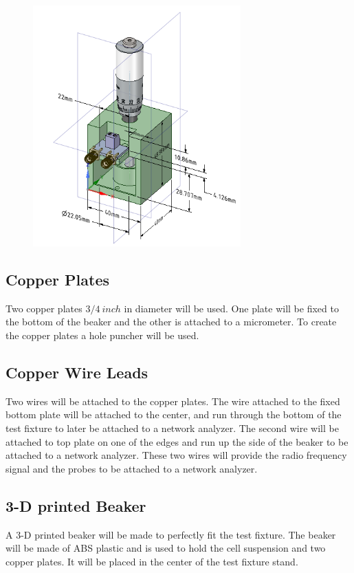 \documentclass[journal]{IEEEtran}
\begin{document}
\begin{figure}[h]
\label{test-fixture}
\includegraphics[width=8cm]{Combined_Test_Fixture.png}
\end{figure}

\subsection{Copper Plates}
Two copper plates $3/4 \: inch$ in diameter will be used. One plate will be fixed to the bottom of the beaker and the other is attached to a micrometer. To create the copper plates a hole puncher will be used.

\subsection{Copper Wire Leads}
Two wires will be attached to the copper plates. The wire attached to the fixed bottom plate will be attached to the center, and run through the bottom of the test fixture to later be attached to a network analyzer. The second wire will be attached to top plate on one of the edges and run up the side of the beaker to be attached to a network analyzer. These two wires will provide the radio frequency signal and the probes to be attached to a network analyzer.

\subsection{3-D printed Beaker}
A 3-D printed beaker will be made to perfectly fit the test fixture. The beaker will be made of ABS plastic and is used to hold the cell suspension and two copper plates. It will be placed in the center of the test fixture stand.
\end{document}

